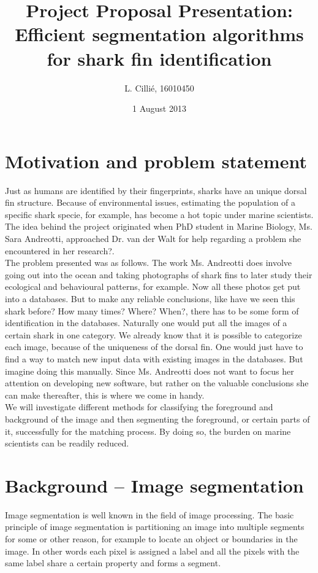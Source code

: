 \documentclass[a4paper,10pt]{article}
\title{Project Proposal Presentation: Efficient segmentation algorithms for
shark fin identification}
\author{L. Cilli\'{e}, 16010450}
\date{1 August 2013}
\begin{document}
\maketitle
\section{Motivation and problem statement}
Just as humans are identified by their fingerprints, sharks have an unique
dorsal fin structure.  Because of environmental issues, estimating the
population of a specific shark specie, for example, has become a hot topic under
marine scientists.  The idea behind the project originated when PhD
student in Marine Biology, Ms. Sara Andreotti, approached Dr. van der Walt for
help
regarding a problem she encountered in her research?. \\ 

The problem presented was
as follows.  The work Ms. Andreotti does involve going out into the ocean and
taking photographs of shark fins to later study their ecological and behavioural
patterns, for example.  Now all these photos get put into a databases. But to
make any reliable conclusions, like have we seen this shark before?  How many
times? Where? When?, there has to be some form of identification in the
databases. 
Naturally one would put all the images of a certain shark in one category.  We
already know that it is possible to categorize each image, because of the
uniqueness of the dorsal fin.  One would just have to find a way to match new
input data with existing images in the databases.  But imagine doing this
manually.  Since Ms. Andreotti does not want to focus her attention on
developing new software, but rather on the valuable conclusions she can make
thereafter, this is where we come in handy. \\

We will investigate different
methods for classifying the foreground and background of the image
and then segmenting the foreground, or certain parts of it, successfully for the
matching process.  By doing so, the burden on marine scientists can be readily 
reduced.


\section{Background -- Image segmentation}
Image segmentation is well known in the field of image processing.  The basic
principle of image segmentation is partitioning an image into multiple segments
for some or other reason, for example to locate an object or boundaries in the
image.  In other words each pixel is assigned a label and all the pixels with
the same label share a certain property and forms a segment.  \\
\end{document}
